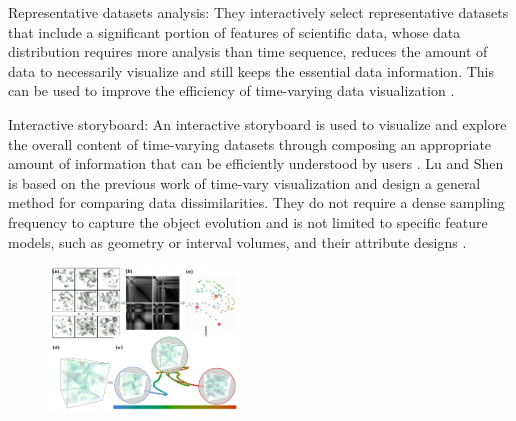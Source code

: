 \documentclass{egpubl}
\begin{document}
Representative datasets analysis: They interactively select representative
datasets that include a significant portion of features of scientific data, whose data distribution requires more analysis than time
sequence, reduces the amount of data to necessarily visualize and still keeps the essential data information. This can be used to improve the efficiency of time-varying data visualization \cite{lu2008interactive}.

Interactive storyboard: An interactive storyboard is used to visualize and explore the overall content of time-varying datasets through composing an appropriate amount of information that can be efficiently understood by users \cite{lu2008interactive}. 
Lu and Shen is based on the previous work of time-vary visualization \cite{hansen2011visualization} and design a general method for comparing data dissimilarities. They do not require a dense sampling frequency to capture the object evolution and is not limited to specific feature models, such as geometry or interval volumes, and their attribute designs \cite{lu2008interactive}. 

\begin{figure}
\includegraphics[width=0.45\textwidth]{./images/lu2008}
\label{lu2008}
\end{figure}
\end{document}
